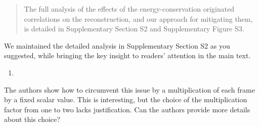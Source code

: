 \documentclass[12pt]{article}
\newenvironment{solved_reviewercomment}
    {\begin{tcolorbox}[width=\linewidth,colback=gray!5,colframe=solved_commentcolor!50,title=Reviewer Comment,left=5pt,right=5pt]}
    {\end{tcolorbox}}
\newenvironment{ourresponse}
    {\begin{tcolorbox}[width=\linewidth,breakable,enhanced,colback=gray!5,colframe=responsecolor!50,title=Response,left=5pt,right=5pt]}
    {\end{tcolorbox}}
\begin{document}
\begin{ourresponse}
\begin{quote}
        
        The full analysis of the effects of the energy-conservation originated correlations on the reconstruction, and our approach for mitigating them, is detailed in Supplementary Section S2 and Supplementary Figure S3.
    \end{quote}
    
    We maintained the detailed analysis in Supplementary Section S2 as you suggested, while bringing the key insight to readers' attention in the main text.

\end{ourresponse}


    
\begin{enumerate}[label=\arabic*., resume]
\item \leavevmode
\end{enumerate}
\vspace{-1em}
\begin{solved_reviewercomment}
    The authors show how to circumvent this issue by a multiplication of each frame by a fixed scalar value. This is interesting, but the choice of the multiplication factor from one to two lacks justification. Can the authors provide more details about this choice? 
\end{solved_reviewercomment}
\end{document}
